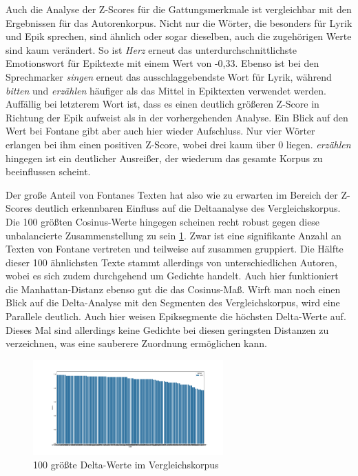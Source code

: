 \documentclass[a4paper,10p]{article}
\begin{document}
Auch die Analyse der Z-Scores für die Gattungsmerkmale ist vergleichbar mit den Ergebnissen für das Autorenkorpus. Nicht nur die Wörter, die besonders für Lyrik und Epik sprechen, sind ähnlich oder sogar dieselben, auch die zugehörigen Werte sind kaum verändert. So ist \textit{Herz} erneut das unterdurchschnittlichste Emotionswort für Epiktexte mit einem Wert von -0,33. Ebenso ist bei den Sprechmarker \textit{singen} erneut das ausschlaggebendste Wort für Lyrik, während \textit{bitten} und \textit{erzählen} häufiger als das Mittel in Epiktexten verwendet werden. Auffällig bei letzterem Wort ist, dass es einen deutlich größeren Z-Score in Richtung der Epik aufweist als in der vorhergehenden Analyse. Ein Blick auf den Wert bei Fontane gibt aber auch hier wieder Aufschluss. Nur vier Wörter erlangen bei ihm einen positiven Z-Score, wobei drei kaum über 0 liegen. \textit{erzählen} hingegen ist ein deutlicher Ausreißer, der wiederum das gesamte Korpus zu beeinflussen scheint. \par 

Der große Anteil von Fontanes Texten hat also wie zu erwarten im Bereich der Z-Scores deutlich erkennbaren Einfluss auf die Deltaanalyse des Vergleichskorpus. Die 100 größten Cosinus-Werte hingegen scheinen recht robust gegen diese unbalancierte Zusammenstellung zu sein \ref{fig:100delta}. Zwar ist eine signifikante Anzahl an Texten von Fontane vertreten und teilweise auf zusammen gruppiert. Die Hälfte dieser 100 ähnlichsten Texte stammt allerdings von unterschiedlichen Autoren, wobei es sich zudem durchgehend um Gedichte handelt. Auch hier funktioniert die Manhattan-Distanz ebenso gut die das Cosinus-Maß. Wirft man noch einen Blick auf die Delta-Analyse mit den Segmenten des Vergleichskorpus, wird eine Parallele deutlich. Auch hier weisen Epiksegmente die höchsten Delta-Werte auf. Dieses Mal sind allerdings keine Gedichte bei diesen geringsten Distanzen zu verzeichnen, was eine sauberere Zuordnung ermöglichen kann. \par 

\begin{figure}
	\includegraphics[width=0.65\textwidth]{vergleich_100cos_gattung.png}
	\caption{100 größte Delta-Werte im Vergleichskorpus}
	\label{fig:100delta}
\end{figure}
\end{document}
